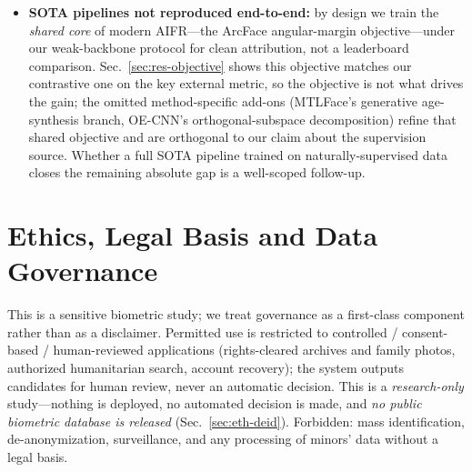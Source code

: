\documentclass[journal]{IEEEtran}
\begin{document}
\begin{itemize}[leftmargin=1.2em]
\item \textbf{SOTA pipelines not reproduced end-to-end:} by design we train the \emph{shared core} of modern AIFR---the ArcFace angular-margin objective---under our weak-backbone protocol for clean attribution, not a leaderboard comparison. Sec.~\ref{sec:res-objective} shows this objective matches our contrastive one on the key external metric, so the objective is not what drives the gain; the omitted method-specific add-ons (MTLFace's generative age-synthesis branch, OE-CNN's orthogonal-subspace decomposition) refine that shared objective and are orthogonal to our claim about the supervision source. Whether a full SOTA pipeline trained on naturally-supervised data closes the remaining absolute gap is a well-scoped follow-up.
\end{itemize}

\section{Ethics, Legal Basis and Data Governance}\label{sec:ethics}
This is a sensitive biometric study; we treat governance as a first-class component rather than as a disclaimer. Permitted use is restricted to controlled / consent-based / human-reviewed applications (rights-cleared archives and family photos, authorized humanitarian search, account recovery); the system outputs candidates for human review, never an automatic decision. This is a \emph{research-only} study---nothing is deployed, no automated decision is made, and \emph{no public biometric database is released} (Sec.~\ref{sec:eth-deid}). Forbidden: mass identification, de-anonymization, surveillance, and any processing of minors' data without a legal basis.
\end{document}

